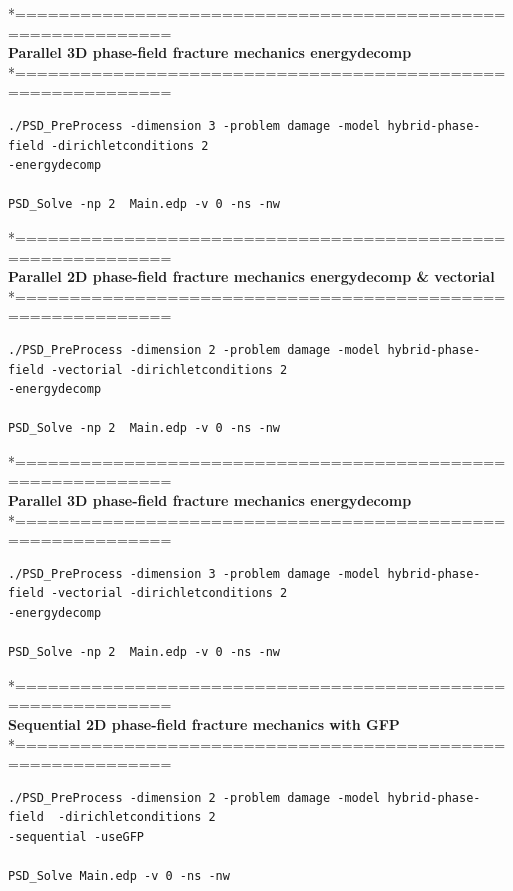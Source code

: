 \documentclass{report}
\begin{document}
*============================================================\\
\textbf{ Parallel 3D phase-field fracture mechanics energydecomp }\\
*============================================================\\
\begin{lstlisting}[style=Linux]
./PSD_PreProcess -dimension 3 -problem damage -model hybrid-phase-field -dirichletconditions 2 
-energydecomp   

PSD_Solve -np 2  Main.edp -v 0 -ns -nw   
\end{lstlisting}
*============================================================\\
\textbf{ Parallel 2D phase-field fracture mechanics energydecomp \& vectorial}\\
*============================================================\\
\begin{lstlisting}[style=Linux]
./PSD_PreProcess -dimension 2 -problem damage -model hybrid-phase-field -vectorial -dirichletconditions 2 
-energydecomp   

PSD_Solve -np 2  Main.edp -v 0 -ns -nw   
\end{lstlisting}
*============================================================\\
\textbf{ Parallel 3D phase-field fracture mechanics energydecomp }\\
*============================================================\\
\begin{lstlisting}[style=Linux]
./PSD_PreProcess -dimension 3 -problem damage -model hybrid-phase-field -vectorial -dirichletconditions 2 
-energydecomp   

PSD_Solve -np 2  Main.edp -v 0 -ns -nw   
\end{lstlisting}
*============================================================\\
\textbf{ Sequential 2D phase-field fracture mechanics with GFP }\\
*============================================================\\
\begin{lstlisting}[style=Linux]
./PSD_PreProcess -dimension 2 -problem damage -model hybrid-phase-field  -dirichletconditions 2 
-sequential -useGFP   

PSD_Solve Main.edp -v 0 -ns -nw   
\end{lstlisting}
\end{document}
